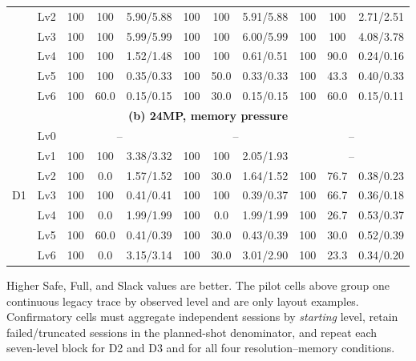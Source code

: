 \begin{table}[t]
{\begin{tabular}{@{}c c || c c c | c c c | c c c@{}}
      & Lv2 & 100 & 100 & 5.90/5.88 & 100 & 100 & 5.91/5.88 &
        100 & 100 & 2.71/2.51 \\
      & Lv3 & 100 & 100 & 5.99/5.99 & 100 & 100 & 6.00/5.99 &
        100 & 100 & 4.08/3.78 \\
      & Lv4 & 100 & 100 & 1.52/1.48 & 100 & 100 & 0.61/0.51 &
        100 & 90.0 & 0.24/0.16 \\
      & Lv5 & 100 & 100 & 0.35/0.33 & 100 & 50.0 & 0.33/0.33 &
        100 & 43.3 & 0.40/0.33 \\
      & Lv6 & 100 & 60.0 & 0.15/0.15 & 100 & 30.0 & 0.15/0.15 &
        100 & 60.0 & 0.15/0.11 \\
    \midrule
    \multicolumn{11}{c}{\textbf{(b) 24MP, memory pressure}} \\
    \midrule
    \multirow{7}{*}{D1}
      & Lv0 & \multicolumn{3}{c|}{--} & \multicolumn{3}{c|}{--} &
        \multicolumn{3}{c}{--} \\
      & Lv1 & 100 & 100 & 3.38/3.32 & 100 & 100 & 2.05/1.93 &
        \multicolumn{3}{c}{--} \\
      & Lv2 & 100 & 0.0 & 1.57/1.52 & 100 & 30.0 & 1.64/1.52 &
        100 & 76.7 & 0.38/0.23 \\
      & Lv3 & 100 & 100 & 0.41/0.41 & 100 & 100 & 0.39/0.37 &
        100 & 66.7 & 0.36/0.18 \\
      & Lv4 & 100 & 0.0 & 1.99/1.99 & 100 & 0.0 & 1.99/1.99 &
        100 & 26.7 & 0.53/0.37 \\
      & Lv5 & 100 & 60.0 & 0.41/0.39 & 100 & 30.0 & 0.43/0.39 &
        100 & 30.0 & 0.52/0.39 \\
      & Lv6 & 100 & 0.0 & 3.15/3.14 & 100 & 30.0 & 3.01/2.90 &
        100 & 23.3 & 0.34/0.20 \\
    \bottomrule
  \end{tabular}%
  }
  \par\vspace{3pt}
  {\footnotesize Higher Safe, Full, and Slack values are better. The pilot
  cells above group one continuous legacy trace by observed level and are only
  layout examples. Confirmatory cells must aggregate independent sessions by
  \emph{starting} level, retain failed/truncated sessions in the planned-shot
  denominator, and repeat each seven-level block for D2 and D3 and for all four
  resolution--memory conditions.}
\end{table}

